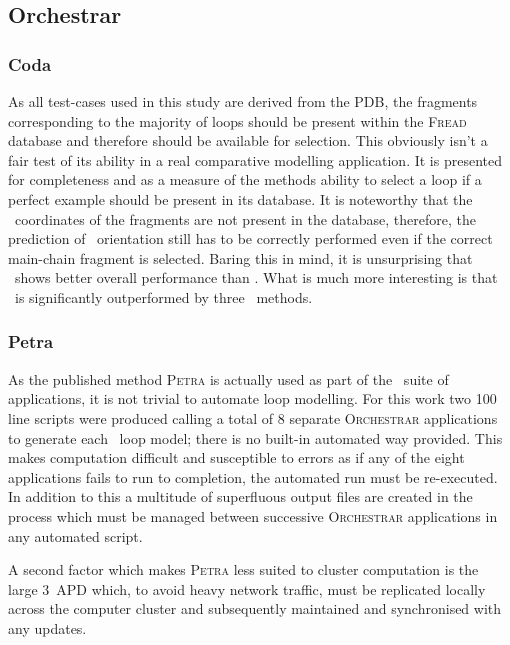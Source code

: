 \subsection{Orchestrar}

\subsubsection{Coda}

As all test-cases used in this study are derived from the PDB, the fragments corresponding to the majority of loops should be present within the \textsc{Fread} database and therefore should be available for selection. This obviously isn't a fair test of its ability in a real comparative modelling application. It is presented for completeness and as a measure of the methods ability to select a loop if a perfect example should be present in its database. It is noteworthy that the \sidechain\ coordinates of the fragments are not present in the database, therefore, the prediction of \sidechain\ orientation still has to be correctly performed even if the correct main-chain fragment is selected.
Baring this in mind, it is unsurprising that \coda\ shows better overall performance than \petra. What is much more interesting is that \coda\ is significantly outperformed by three \abinitio\ methods.

\subsubsection{Petra}

As the published method \textsc{Petra} is actually used as part of the \orchestrar\ suite of applications, it is not trivial to automate loop modelling. For this work two 100 line scripts were produced calling a total of 8 separate \textsc{Orchestrar} applications to generate each \abinitio\ loop model; there is no built-in automated way provided. This makes computation difficult and susceptible to errors as if any of the eight applications fails to run to completion, the automated run must be re-executed. In addition to this a multitude of superfluous output files are created in the process which must be managed between successive \textsc{Orchestrar} applications in any automated script. 

A second factor which makes \textsc{Petra} less suited to cluster computation is the large 3\gb\ APD which, to avoid heavy network traffic, must be replicated locally across the computer cluster and subsequently maintained and synchronised with any updates.

